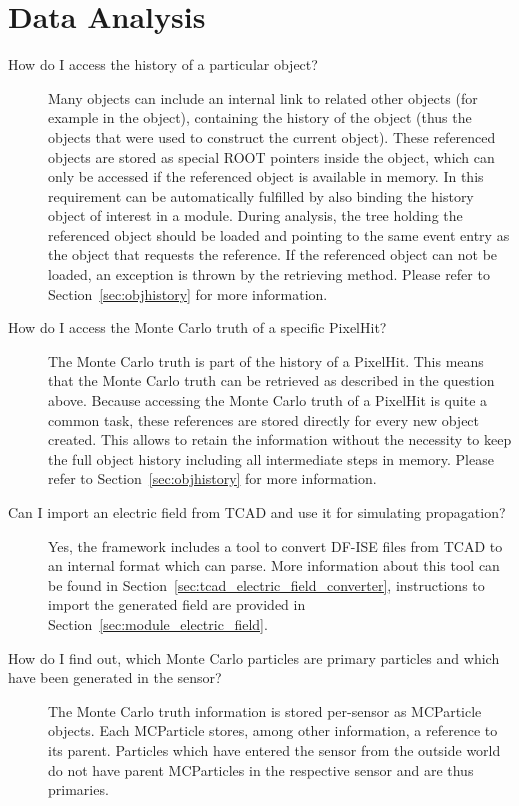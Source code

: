\section{Data Analysis}
\begin{description}
\item[How do I access the history of a particular object?]
Many objects can include an internal link to related other objects (for example  in the  object), containing the history of the object (thus the objects that were used to construct the current object).
These referenced objects are stored as special ROOT pointers inside the object, which can only be accessed if the referenced object is available in memory.
In \apsq this requirement can be automatically fulfilled by also binding the history object of interest in a module.
During analysis, the tree holding the referenced object should be loaded and pointing to the same event entry as the object that requests the reference.
If the referenced object can not be loaded, an exception is thrown by the retrieving method.
Please refer to Section~\ref{sec:objhistory} for more information.
\item[How do I access the Monte Carlo truth of a specific PixelHit?]
The Monte Carlo truth is part of the history of a PixelHit.
This means that the Monte Carlo truth can be retrieved as described in the question above.
Because accessing the Monte Carlo truth of a PixelHit is quite a common task, these references are stored directly for every new object created.
This allows to retain the information without the necessity to keep the full object history including all intermediate steps in memory.
Please refer to Section~\ref{sec:objhistory} for more information.
\item[Can I import an electric field from TCAD and use it for simulating propagation?]
Yes, the framework includes a tool to convert DF-ISE files from TCAD to an internal format which \apsq can parse.
More information about this tool can be found in Section~\ref{sec:tcad_electric_field_converter}, instructions to import the generated field are provided in Section~\ref{sec:module_electric_field}.
\item[How do I find out, which Monte Carlo particles are primary particles and which have been generated in the sensor?]
The Monte Carlo truth information is stored per-sensor as MCParticle objects. Each MCParticle stores, among other information, a reference to its parent. Particles which have entered the sensor from the outside world do not have parent MCParticles in the respective sensor and are thus primaries.


\end{description}

